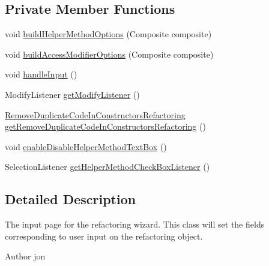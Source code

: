 \subsection*{Private Member Functions}
\begin{DoxyCompactItemize}
\item 
void \hyperlink{classedu_1_1illinois_1_1canistelCassabanana_1_1RemoveDuplicateCodeInConstructorsInputPage_a9d523dfb5ee2d5cc7291b443ae27f48e}{buildHelperMethodOptions} (Composite composite)
\item 
void \hyperlink{classedu_1_1illinois_1_1canistelCassabanana_1_1RemoveDuplicateCodeInConstructorsInputPage_a10d164d3a8635fec5038274620a1ad58}{buildAccessModifierOptions} (Composite composite)
\item 
void \hyperlink{classedu_1_1illinois_1_1canistelCassabanana_1_1RemoveDuplicateCodeInConstructorsInputPage_a240da4f4f9c7d6a035752c09e159a0cc}{handleInput} ()
\item 
ModifyListener \hyperlink{classedu_1_1illinois_1_1canistelCassabanana_1_1RemoveDuplicateCodeInConstructorsInputPage_a552ef6f127b8dccb87a8ec49b43d05f4}{getModifyListener} ()
\item 
\hyperlink{classedu_1_1illinois_1_1canistelCassabanana_1_1RemoveDuplicateCodeInConstructorsRefactoring}{RemoveDuplicateCodeInConstructorsRefactoring} \hyperlink{classedu_1_1illinois_1_1canistelCassabanana_1_1RemoveDuplicateCodeInConstructorsInputPage_a90f01a38343d273b9f0e74308fdb50d8}{getRemoveDuplicateCodeInConstructorsRefactoring} ()
\item 
void \hyperlink{classedu_1_1illinois_1_1canistelCassabanana_1_1RemoveDuplicateCodeInConstructorsInputPage_a37c78a173d55c36fcdfeebc22ae670a5}{enableDisableHelperMethodTextBox} ()
\item 
SelectionListener \hyperlink{classedu_1_1illinois_1_1canistelCassabanana_1_1RemoveDuplicateCodeInConstructorsInputPage_a58bda71e4e39f368ec1d1419b2c65825}{getHelperMethodCheckBoxListener} ()
\end{DoxyCompactItemize}


\subsection{Detailed Description}
The input page for the refactoring wizard. This class will set the fields corresponding to user input on the refactoring object.

\begin{DoxyAuthor}{Author}
jon 
\end{DoxyAuthor}


